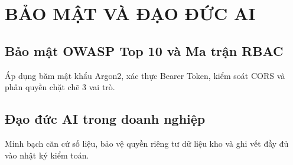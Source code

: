 \chapter{BẢO MẬT VÀ ĐẠO ĐỨC AI}
\label{ch:11}

\section{Bảo mật OWASP Top 10 và Ma trận RBAC}
Áp dụng băm mật khẩu Argon2, xác thực Bearer Token, kiểm soát CORS và phân quyền chặt chẽ 3 vai trò.

\section{Đạo đức AI trong doanh nghiệp}
Minh bạch căn cứ số liệu, bảo vệ quyền riêng tư dữ liệu kho và ghi vết đầy đủ vào nhật ký kiểm toán.
